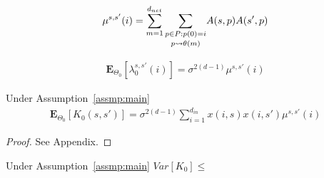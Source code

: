 {\begin{definition}
\begin{align*}
\mu^{s,s'}(i)=\sum_{m=1}^{d_{net}} \underset{p\rightsquigarrow\theta(m)}{\sum_{p\in P: p(0)=i}}A(s,p) A(s',p)
\end{align*}

\end{definition}

\begin{lemma}
\begin{align*}
\mathbf{E}_{\Theta_0}\left[\lambda^{s,s'}_0(i)\right]=\sigma^{2(d-1)}\mu^{s,s'}(i)
\end{align*}
\end{lemma}

\begin{theorem}\label{th:dgnexp}
 Under Assumption~\ref{assmp:main}
 \begin{align*}
\mathbf{E}_{\Theta_0}\left[K_0(s,s')\right]=\sigma^{2(d-1)}\sum_{i=1}^{d_{in}}x(i,s) x(i,s')\mu^{s,s'}(i)
\end{align*}

\end{theorem}
\begin{proof}
See Appendix.
\end{proof}

\begin{theorem}\label{th:dgnvar}
 Under Assumption~\ref{assmp:main} $Var\left[K_0\right]\leq $
\end{theorem}

}
